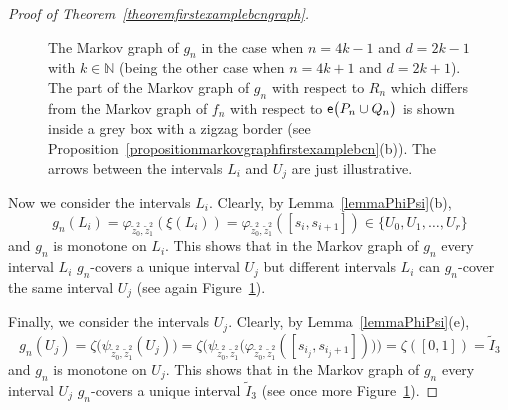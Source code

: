 \documentclass[a4paper, 11pt]{amsart}
\numberwithin{equation}{section}
\theoremstyle{customnumberedtheorem}
\theoremstyle{definitionwithbfnote}
\newcommand{\N}{\ensuremath{\mathbb{N}}}
\DeclareMathOperator{\eexp}{\textsf{\upshape e}}
\newcommand{\bigemap}[1]{\ensuremath{\eexp\bigl(#1\bigr)}}
\begin{document}
\begin{proof}[Proof of Theorem~\ref{theoremfirstexamplebcngraph}]
\begin{figure}[ht]
\begin{center}
\end{center}
\caption{The Markov graph of $g_n$ in the case when
$n = 4k-1$ and $d = 2k-1$ with $k \in \N$
(being the other case when $n = 4k+1$ and $d = 2k+1$).
The part of the Markov graph of $g_n$ with respect to $R_n$
which differs from the Markov graph of $f_n$ with respect to
$\bigemap{P_n \cup Q_n}$ is shown inside a grey box with a
zigzag border
(see Proposition~\ref{propositionmarkovgraphfirstexamplebcn}(b)).
The arrows between the intervals $L_i$ and $U_j$
are just illustrative.}\label{fig:MarkovGraphofgnfirstexamplebcn}
\end{figure}

\medskip

Now we consider the intervals $L_i.$ Clearly, by Lemma~\ref{lemmaPhiPsi}(b),
\[
g_n(L_i) = \varphi_{\tilde{z}^2_0, \tilde{z}^2_1} (\xi(L_i))
         = \varphi_{\tilde{z}^2_0, \tilde{z}^2_1} ([s_i,s_{i+1}])
         \in \{U_0, U_1,\dots,U_r\}
\]
and $g_n$ is monotone on $L_i.$
This shows that in the Markov graph of $g_n$ every interval $L_i$
$g_n$-covers a unique interval $U_j$ but different intervals $L_i$
can $g_n$-cover the same interval $U_j$
(see again Figure~\ref{fig:MarkovGraphofgnfirstexamplebcn}).

Finally, we consider the intervals $U_j.$
Clearly, by Lemma~\ref{lemmaPhiPsi}(e),
\[
g_n(U_j) = \zeta \bigl(\psi_{\tilde{z}^2_0, \tilde{z}^2_1}(U_j)\bigr)
         = \zeta \bigl(\psi_{\tilde{z}^2_0, \tilde{z}^2_1}\bigl(\varphi_{\tilde{z}^2_0, \tilde{z}^2_1} ([s_{i_j},s_{i_j+1}])\bigr)\bigr)
         = \zeta([0,1]) = \widetilde{I}_3
\]
and $g_n$ is monotone on $U_j.$
This shows that in the Markov graph of $g_n$ every interval $U_j$
$g_n$-covers a unique interval $\widetilde{I}_3$
(see once more Figure~\ref{fig:MarkovGraphofgnfirstexamplebcn}).


\end{proof}
\end{document}
